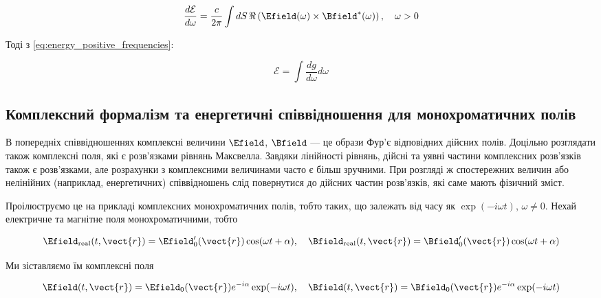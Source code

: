 \begin{equation}
\frac{d\mathcal{E}}{d\omega} = \frac{c}{2\pi} \int dS \, \Re\left(\Efield(\omega) \times \Bfield^{*}(\omega)\right), \quad \omega > 0
\label{eq:energy_density}
\end{equation}

Тоді з \eqref{eq:energy_positive_frequencies}:

\begin{equation}
\mathcal{E} = \int \frac{dg}{d\omega} d\omega
\label{eq:total_energy_integral}
\end{equation}

\subsection*{Комплексний формалізм та енергетичні співвідношення для монохроматичних полів}

В попередніх співвідношеннях комплексні величини \(\Efield\), \(\Bfield\) --- це образи Фур’є відповідних дійсних полів. Доцільно розглядати також
комплексні поля, які є розв’язками рівнянь Максвелла. Завдяки лінійності рівнянь, дійсні та уявні частини комплексних розв’язків також є розв’язками,
але розрахунки з комплексними величинами часто є більш зручними. При розгляді ж спостережних величин або нелінійних (наприклад, енергетичних)
співвідношень слід повернутися до дійсних частин розв’язків, які саме мають фізичний зміст.

Проілюструємо це на прикладі комплексних монохроматичних полів, тобто таких, що залежать від часу як \(\exp(-i\omega t)\), \(\omega \neq 0\). Нехай
електричне та магнітне поля монохроматичними, тобто

\begin{equation}
\Efield_{\text{real}}(t, \vect{r}) = \Efield'_0(\vect{r}) \cos(\omega t + \alpha), \quad \Bfield_{\text{real}}(t, \vect{r}) = \Bfield'_0(\vect{r})
\cos(\omega t + \alpha)
\label{eq:real_fields}
\end{equation}

Ми зіставляємо їм комплексні поля

\begin{equation}
\Efield(t, \vect{r}) = \Efield_0(\vect{r}) e^{-i\alpha} \exp(-i\omega t), \quad \Bfield(t, \vect{r}) = \Bfield_0(\vect{r}) e^{-i\alpha}
\exp(-i\omega t)
\label{eq:complex_fields}
\end{equation}

